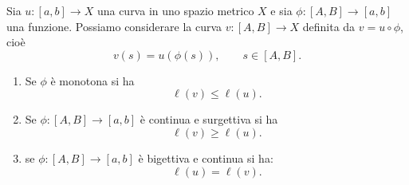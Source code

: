 \begin{theorem}[riparametrizzazione]\label{th:riparametrizzazione}
Sia $u \colon [a,b] \to X$ una curva in uno spazio metrico $X$ 
e sia $\phi \colon [A,B] \to [a,b]$ una funzione.
Possiamo considerare la curva $v \colon [A,B] \to X$ definita da
$v=u \circ \phi$, cioè
\[
  v(s) = u(\phi(s)), \qquad s\in [A,B].
\]

\begin{enumerate}
\item
Se $\phi$ è monotona si ha
\[
  \ell(v) \le \ell(u).
\]
\item Se $\phi\colon [A,B] \to [a,b]$ è continua e surgettiva si ha
\[
  \ell(v) \ge \ell(u).
\]
\item se $\phi\colon [A,B] \to [a,b]$ è bigettiva e continua
si ha:
\[
  \ell(u) = \ell(v).
\]
\end{enumerate}
\end{theorem}
%
